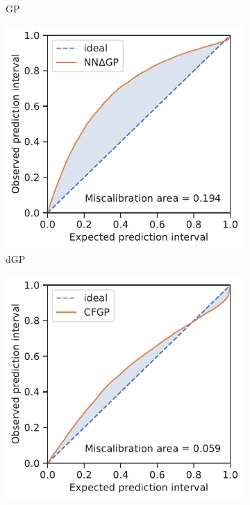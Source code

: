 \documentclass[]{achemso}
\begin{document}
\begin{figure}
\begin{subfigure}{0.32\textwidth}
        \caption{\gls{GP}}\label{fig:calibration_gp}
    \end{subfigure}
    \begin{subfigure}{0.32\textwidth}
        \includegraphics[width=\textwidth]{../NNdGP/Matern/calibration.pdf}
        \caption{\gls{dGP}}\label{fig:calibration_dgp}
    \end{subfigure}
    \begin{subfigure}{0.32\textwidth}
        \includegraphics[width=\textwidth]{../CFGP/Matern/calibration.pdf}

\end{subfigure}
\end{figure}
\end{document}
